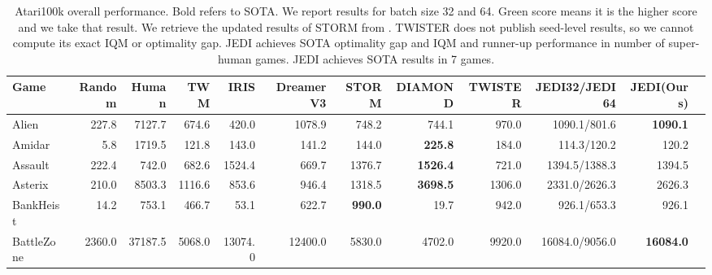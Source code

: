 \documentclass{article}
\begin{document}
\begin{table}[t]
  \centering
  \tiny
  \caption{Atari100k overall performance. Bold refers to SOTA. We report results for batch size 32 and 64. Green score means it is the higher score and we take that result. We retrieve the updated results of STORM from \cite{OC-STORM}. TWISTER does not publish seed-level results, so we cannot compute its exact IQM or optimality gap. JEDI achieves SOTA optimality gap and IQM and runner-up performance in number of super-human games. JEDI achieves SOTA results in 7 games.}
  \label{tab:atari100k_FULL_NUMBERS}

    \begin{tabular}{
        l                                %
        rrrrrrrrrrr                   %
    }
\toprule
Game                   &  Random    &  Human     &  TWM                &  IRIS      &  DreamerV3   &  STORM              &  DIAMOND            &  TWISTER            &  JEDI32/JEDI64                             &  JEDI(Ours)         \\
\midrule
Alien                  &  227.8     &  7127.7    &  674.6              &  420.0     &  1078.9      &  748.2              &  744.1              &  970.0              &  \textcolor{pastelgreen}{1090.1}/801.6     &  \textbf{1090.1}    \\
Amidar                 &  5.8       &  1719.5    &  121.8              &  143.0     &  141.2       &  144.0              &  \textbf{225.8}     &  184.0              &  114.3/\textcolor{pastelgreen}{120.2}      &  120.2              \\
Assault                &  222.4     &  742.0     &  682.6              &  1524.4    &  669.7       &  1376.7             &  \textbf{1526.4}    &  721.0              &  \textcolor{pastelgreen}{1394.5}/1388.3    &  1394.5             \\
Asterix                &  210.0     &  8503.3    &  1116.6             &  853.6     &  946.4       &  1318.5             &  \textbf{3698.5}    &  1306.0             &  2331.0/\textcolor{pastelgreen}{2626.3}    &  2626.3             \\
BankHeist              &  14.2      &  753.1     &  466.7              &  53.1      &  622.7       &  \textbf{990.0}     &  19.7               &  942.0              &  \textcolor{pastelgreen}{926.1}/653.3      &  926.1              \\
BattleZone             &  2360.0    &  37187.5   &  5068.0             &  13074.0   &  12400.0     &  5830.0             &  4702.0             &  9920.0             &  \textcolor{pastelgreen}{16084.0}/9056.0   &  \textbf{16084.0}   \\

\end{tabular}
\end{table}
\end{document}
